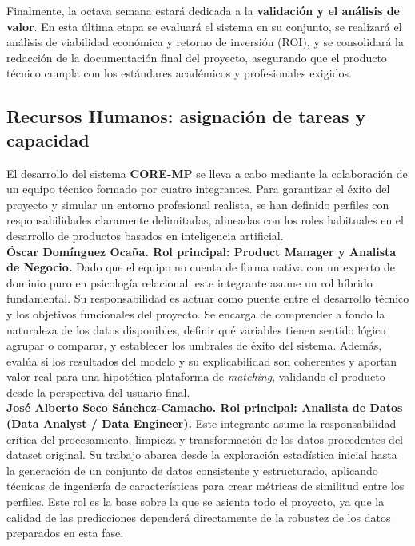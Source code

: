 Finalmente, la octava semana estará dedicada a la \textbf{validación y el análisis de valor}. En esta última etapa se evaluará el sistema en su conjunto, se realizará el análisis de viabilidad económica y retorno de inversión (ROI), y se consolidará la redacción de la documentación final del proyecto, asegurando que el producto técnico cumpla con los estándares académicos y profesionales exigidos.

\subsection{Recursos Humanos: asignación de tareas y capacidad}

El desarrollo del sistema \textbf{CORE-MP} se lleva a cabo mediante la colaboración de un equipo técnico formado por cuatro integrantes. Para garantizar el éxito del proyecto y simular un entorno profesional realista, se han definido perfiles con responsabilidades claramente delimitadas, alineadas con los roles habituales en el desarrollo de productos basados en inteligencia artificial.\\

\textbf{Óscar Domínguez Ocaña. Rol principal: Product Manager y Analista de Negocio.} Dado que el equipo no cuenta de forma nativa con un experto de dominio puro en psicología relacional, este integrante asume un rol híbrido fundamental. Su responsabilidad es actuar como puente entre el desarrollo técnico y los objetivos funcionales del proyecto. Se encarga de comprender a fondo la naturaleza de los datos disponibles, definir qué variables tienen sentido lógico agrupar o comparar, y establecer los umbrales de éxito del sistema. Además, evalúa si los resultados del modelo y su explicabilidad son coherentes y aportan valor real para una hipotética plataforma de \textit{matching}, validando el producto desde la perspectiva del usuario final.\\

\textbf{José Alberto Seco Sánchez-Camacho. Rol principal: Analista de Datos (Data Analyst / Data Engineer).} Este integrante asume la responsabilidad crítica del procesamiento, limpieza y transformación de los datos procedentes del dataset original. Su trabajo abarca desde la exploración estadística inicial hasta la generación de un conjunto de datos consistente y estructurado, aplicando técnicas de ingeniería de características para crear métricas de similitud entre los perfiles. Este rol es la base sobre la que se asienta todo el proyecto, ya que la calidad de las predicciones dependerá directamente de la robustez de los datos preparados en esta fase.\\

